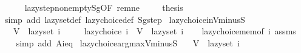 \begin{isabellebody}
\ \ \ \ \isamarkupfalse%
\ lazy{\isacharunderscore}{\kern0pt}step{\isacharunderscore}{\kern0pt}nonempty{\isacharunderscore}{\kern0pt}Sg{\isacharbrackleft}{\kern0pt}OF\ rem{\isacharunderscore}{\kern0pt}ne{\isacharbrackright}{\kern0pt}\ \isakeywordONE{{\isachardot}{\kern0pt}}\isamarkupfalse%
\isanewline
\ \ \isamarkupfalse%
\ {\isacharquery}{\kern0pt}thesis\isanewline
\ \ \ \ \isamarkupfalse%
\ {\isacharparenleft}{\kern0pt}simp\ add{\isacharcolon}{\kern0pt}\ lazy{\isacharunderscore}{\kern0pt}set{\isacharunderscore}{\kern0pt}def\ lazy{\isacharunderscore}{\kern0pt}choice{\isacharunderscore}{\kern0pt}def\ Sg{\isacharunderscore}{\kern0pt}step{\isacharparenright}{\kern0pt}\isanewline
{}\isamarkupfalse%
%
\endisatagproof
{\isafoldproof}%
%
\isadelimproof
\isanewline
%
\endisadelimproof
\isanewline
{}\isamarkupfalse%
\ lazy{\isacharunderscore}{\kern0pt}choice{\isacharunderscore}{\kern0pt}in{\isacharunderscore}{\kern0pt}V{\isacharunderscore}{\kern0pt}minus{\isacharunderscore}{\kern0pt}S{\isacharcolon}{\kern0pt}\isanewline
\ \ \ {\isachardoublequoteopen}V\ {\isacharminus}{\kern0pt}\ lazy{\isacharunderscore}{\kern0pt}set\ i\ {\isasymnoteq}\ {\isacharbraceleft}{\kern0pt}{\isacharbraceright}{\kern0pt}{\isachardoublequoteclose}\isanewline
\ \ \ {\isachardoublequoteopen}lazy{\isacharunderscore}{\kern0pt}choice\ i\ {\isasymin}\ V\ {\isacharminus}{\kern0pt}\ lazy{\isacharunderscore}{\kern0pt}set\ i{\isachardoublequoteclose}\isanewline
%
\isadelimproof
\ \ %
\endisadelimproof
%
\isatagproof
{}\isamarkupfalse%
\ lazy{\isacharunderscore}{\kern0pt}choice{\isacharunderscore}{\kern0pt}mem{\isacharbrackleft}{\kern0pt}of\ i{\isacharbrackright}{\kern0pt}\ assms\isanewline
\ \ \isamarkupfalse%
\ {\isacharparenleft}{\kern0pt}simp\ add{\isacharcolon}{\kern0pt}\ A{\isacharunderscore}{\kern0pt}i{\isacharunderscore}{\kern0pt}eq{\isacharparenright}{\kern0pt}%
\endisatagproof
{\isafoldproof}%
%
\isadelimproof
\isanewline
%
\endisadelimproof
\isanewline
{}\isamarkupfalse%
\ lazy{\isacharunderscore}{\kern0pt}choice{\isacharunderscore}{\kern0pt}argmax{\isacharunderscore}{\kern0pt}V{\isacharunderscore}{\kern0pt}minus{\isacharunderscore}{\kern0pt}S{\isacharcolon}{\kern0pt}\isanewline
\ \ \ {\isachardoublequoteopen}V\ {\isacharminus}{\kern0pt}\ lazy{\isacharunderscore}{\kern0pt}set\ i\ {\isasymnoteq}\ {\isacharbraceleft}{\kern0pt}{\isacharbraceright}{\kern0pt}{\isachardoublequoteclose}\isanewline

\end{isabellebody}
